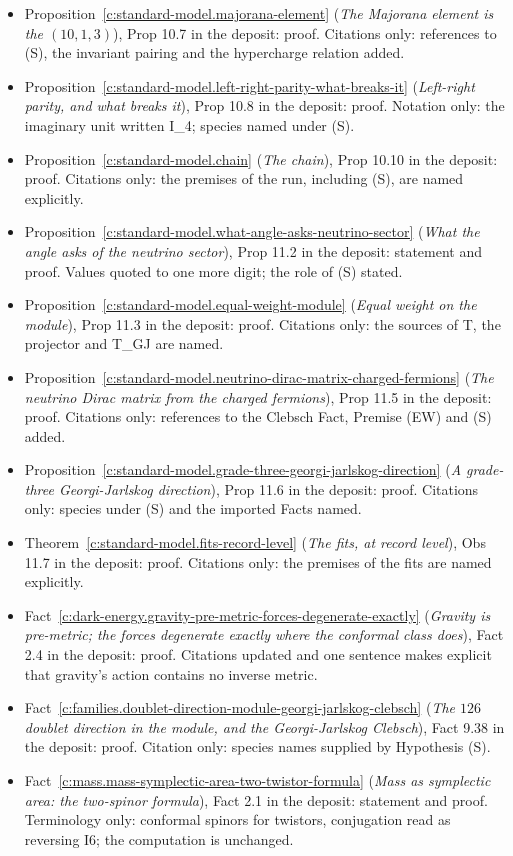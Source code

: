 \documentclass[11pt]{article}
\theoremstyle{definition}
\theoremstyle{plain}
\begin{document}
\begin{itemize}
\item Proposition~\ref{c:standard-model.majorana-element} (\emph{The Majorana element is the $(10,1,3)$}), Prop 10.7 in the deposit: proof. Citations only: references to (S), the invariant pairing and the hypercharge relation added.
\item Proposition~\ref{c:standard-model.left-right-parity-what-breaks-it} (\emph{Left-right parity, and what breaks it}), Prop 10.8 in the deposit: proof. Notation only: the imaginary unit written I\_4; species named under (S).
\item Proposition~\ref{c:standard-model.chain} (\emph{The chain}), Prop 10.10 in the deposit: proof. Citations only: the premises of the run, including (S), are named explicitly.
\item Proposition~\ref{c:standard-model.what-angle-asks-neutrino-sector} (\emph{What the angle asks of the neutrino sector}), Prop 11.2 in the deposit: statement and proof. Values quoted to one more digit; the role of (S) stated.
\item Proposition~\ref{c:standard-model.equal-weight-module} (\emph{Equal weight on the module}), Prop 11.3 in the deposit: proof. Citations only: the sources of T, the projector and T\_GJ are named.
\item Proposition~\ref{c:standard-model.neutrino-dirac-matrix-charged-fermions} (\emph{The neutrino Dirac matrix from the charged fermions}), Prop 11.5 in the deposit: proof. Citations only: references to the Clebsch Fact, Premise (EW) and (S) added.
\item Proposition~\ref{c:standard-model.grade-three-georgi-jarlskog-direction} (\emph{A grade-three Georgi-Jarlskog direction}), Prop 11.6 in the deposit: proof. Citations only: species under (S) and the imported Facts named.
\item Theorem~\ref{c:standard-model.fits-record-level} (\emph{The fits, at record level}), Obs 11.7 in the deposit: proof. Citations only: the premises of the fits are named explicitly.
\item Fact~\ref{c:dark-energy.gravity-pre-metric-forces-degenerate-exactly} (\emph{Gravity is pre-metric; the forces degenerate exactly where the conformal class does}), Fact 2.4 in the deposit: proof. Citations updated and one sentence makes explicit that gravity's action contains no inverse metric.
\item Fact~\ref{c:families.doublet-direction-module-georgi-jarlskog-clebsch} (\emph{The $126$ doublet direction in the module, and the Georgi-Jarlskog Clebsch}), Fact 9.38 in the deposit: proof. Citation only: species names supplied by Hypothesis (S).
\item Fact~\ref{c:mass.mass-symplectic-area-two-twistor-formula} (\emph{Mass as symplectic area: the two-spinor formula}), Fact 2.1 in the deposit: statement and proof. Terminology only: conformal spinors for twistors, conjugation read as reversing I6; the computation is unchanged.
\end{itemize}
\end{document}
